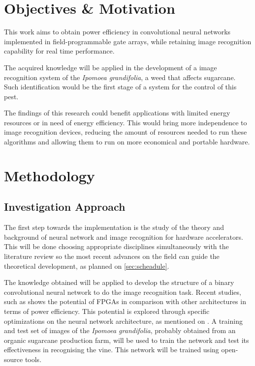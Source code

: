 \documentclass[
    12pt,                       %
    oneside,                    %
    a4paper,                    %
    brazil,                     %
    french,                     %
    spanish,                    %
    english,                    %
    ]{abntex2}
\begin{document}
\chapter[Objectives]{Objectives \& Motivation}

This work aims to obtain power efficiency in convolutional neural networks implemented in field-programmable gate arrays, while retaining image recognition capability for real time performance.

The acquired knowledge will be applied in the development of a image recognition system of the \textit{Ipomoea grandifolia}, a weed that affects sugarcane. Such identification would be the first stage of a system for the control of this pest.

The findings of this research could benefit applications with limited energy resources or in need of energy efficiency. This would bring more independence to image recognition devices, reducing the amount of resources needed to run these algorithms and allowing them to run on more economical and portable hardware.

\chapter[Methodology]{Methodology}
\section{Investigation Approach}

The first step towards the implementation is the study of the theory and background of neural network and image recognition for hardware accelerators. This will be done choosing appropriate disciplines simultaneously with the literature review so the most recent advances on the field can guide the theoretical development, as planned on \autoref{sec:scheadule}.

The knowledge obtained will be applied to develop the structure of a binary convolutional neural network to do the image recognition task. Recent studies, such as \textcite{Nurvitadhi2017_0} shows the potential of FPGAs in comparison with other architectures in terms of power efficiency. This potential is explored through specific optimizations on the neural network architecture, as mentioned on \textcites{Courbariaux2015, Zhang2017}. A training and test set of images of the \textit{Ipomoea grandifolia}, probably obtained from an organic sugarcane production farm, will be used to train the network and test its effectiveness in recognising the vine. This network will be trained using open-source tools.
\end{document}
